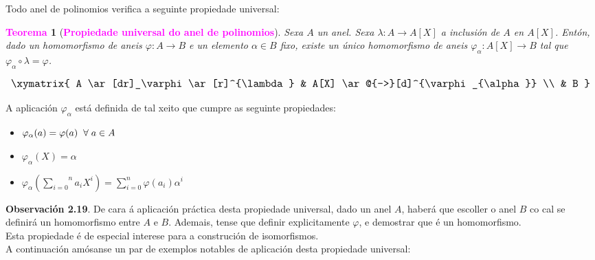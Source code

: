 \documentclass[twoside]{report}
\newcommand{\magbf}[1]{\textcolor{magenta}{\textbf{#1}}} %
\theoremstyle{mystyle}
\newtheorem{theo}{\magbf{Teorema}}[chapter]
\newenvironment{theorem}
{\begin{mdframed}[linecolor = magenta,backgroundcolor = classicrose, linewidth = 2mm]\begin{theo}}
{\end{theo}\end{mdframed}}
\begin{document}
\noindent Todo anel de polinomios verifica a seguinte propiedade universal:\\

\begin{theorem}[\magbf{Propiedade universal do anel de polinomios}] \label{th2.8}
Sexa $A$ un anel. Sexa $\lambda: A \longrightarrow A[X]$ a inclusión de $A$ en $A[X]$. Entón, dado un homomorfismo de aneis $\varphi: A \longrightarrow B$ e un elemento $\alpha \in B$ fixo, existe un único homomorfismo de aneis $\varphi_{\alpha}: A[X] \longrightarrow B$ tal que $\varphi_{\alpha} \circ \lambda = \varphi$.
\end{theorem}

$$
     \large \xymatrix{
        A \ar[dr]_\varphi \ar[r]^{\lambda} & A[X] \ar@{-->}[d]^{\varphi_{\alpha}} \\
          & B
    }    
$$

\vspace{3mm}

\noindent A aplicación $\varphi_{\alpha}$ está definida de tal xeito que cumpre as seguinte propiedades:

\begin{itemize}
    \item $\varphi_{\alpha}(a) = \varphi(a) \hspace{2mm} \forall \hspace{1mm} a \in A$
    \item $\varphi_{\alpha}(X) = \alpha$
    \item $\varphi_{\alpha}\left(\overset{n}{\underset{i = 0}{\sum}}a_{i}X^{i}\right) = \displaystyle \sum_{i = 0}^{n}{\varphi(a_{i})\alpha^{i}} $
\end{itemize}

\noindent \textbf{Observación 2.19}. De cara á aplicación práctica desta propiedade universal, dado un anel $A$, haberá que escoller o anel $B$ co cal se definirá un homomorfismo entre $A$ e $B$. Ademais, tense que definir explicitamente $\varphi$, e demostrar que é un homomorfismo.\\

\noindent Esta propiedade é de especial interese para a construción de isomorfismos.\\

\noindent A continuación amósanse un par de exemplos notables de aplicación desta propiedade universal:
\end{document}
